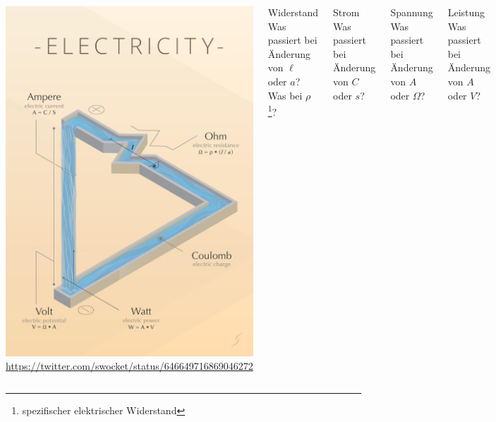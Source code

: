 \begin{frame}
  \begin{columns}
      \begin{center}
	\includegraphics[width=1\textwidth]{e03/electricity.jpg}\\
	\tiny \url{https://twitter.com/swocket/status/646649716869046272}
      \end{center}
      \pause
      \begin{exampleblock}{Widerstand}
	Was passiert bei Änderung von $\ell$ oder $a$? Was bei $\rho$\footnote{\tiny spezifischer elektrischer Widerstand}?
      \end{exampleblock}
      \pause
      \begin{exampleblock}{Strom}
	Was passiert bei Änderung von $C$ oder $s$?
      \end{exampleblock}
      \pause
      \begin{exampleblock}{Spannung}
	Was passiert bei Änderung von $A$ oder $\Omega$?
      \end{exampleblock}
      \pause
      \begin{exampleblock}{Leistung}
	Was passiert bei Änderung von $A$ oder $V$?
      \end{exampleblock}
  \end{columns}
\end{frame}

